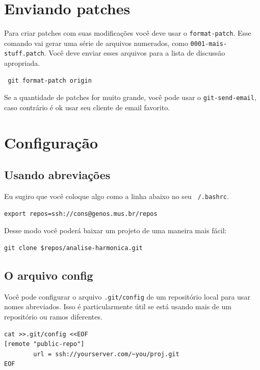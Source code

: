 \documentclass[12pt,brazil]{book}
\begin{document}
\section{Enviando patches}
\label{sec:enviando-patches}

Para criar patches com suas modificações você deve usar o
\texttt{format-patch}. Esse comando vai gerar uma série de arquivos
numerados, como \texttt{0001-mais-stuff.patch}. Você deve enviar esses
arquivos para a lista de discussão apropriada.

\begin{verbatim}
 git format-patch origin
\end{verbatim}

Se a quantidade de patches for muito grande, você pode usar o
\texttt{git-send-email}, caso contrário é ok usar seu cliente de email
favorito.

\section{Configuração}
\label{sec:configuracao}

\subsection{Usando abreviações}
\label{sec:usando-abreviacoes}

Eu sugiro que você coloque algo como a linha abaixo no seu
\texttt{~/.bashrc}.

\begin{verbatim}
export repos=ssh://cons@genos.mus.br/repos
\end{verbatim}

Desse modo você poderá baixar um projeto de uma maneira mais fácil:

\begin{verbatim}
git clone $repos/analise-harmonica.git
\end{verbatim}

\subsection{O arquivo config}
\label{sec:o-arquivo-config}

Você pode configurar o arquivo \texttt{.git/config} de um repositório
local para usar nomes abreviados. Isso é particularmente útil se está
usando mais de um repositório ou ramos diferentes.

\begin{verbatim}
cat >>.git/config <<EOF
[remote "public-repo"]
        url = ssh://yourserver.com/~you/proj.git
EOF
\end{verbatim}
\end{document}

